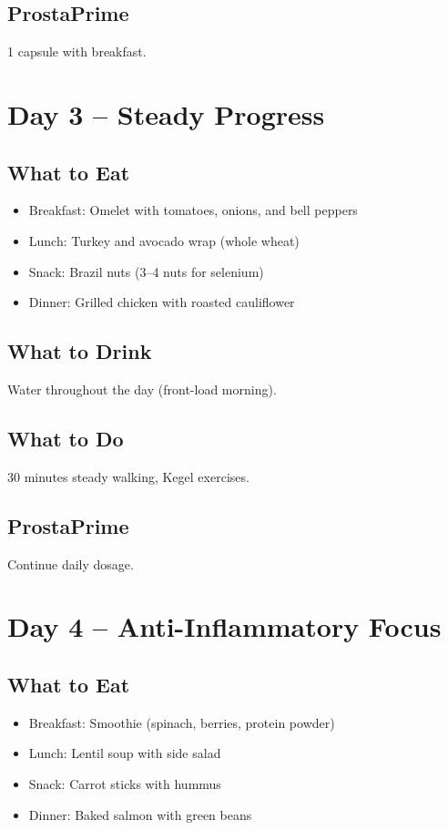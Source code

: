 \documentclass[11pt,oneside]{book}
\begin{document}
\section*{ProstaPrime}
1 capsule with breakfast.

\clearpage
\chapter*{Day 3 – Steady Progress}

\section*{What to Eat}
\begin{itemize}[leftmargin=*]
\item Breakfast: Omelet with tomatoes, onions, and bell peppers
\item Lunch: Turkey and avocado wrap (whole wheat)
\item Snack: Brazil nuts (3--4 nuts for selenium)
\item Dinner: Grilled chicken with roasted cauliflower
\end{itemize}

\section*{What to Drink}
Water throughout the day (front-load morning).

\section*{What to Do}
30 minutes steady walking, Kegel exercises.

\section*{ProstaPrime}
Continue daily dosage.

\clearpage
\chapter*{Day 4 – Anti-Inflammatory Focus}

\section*{What to Eat}
\begin{itemize}[leftmargin=*]
\item Breakfast: Smoothie (spinach, berries, protein powder)
\item Lunch: Lentil soup with side salad
\item Snack: Carrot sticks with hummus
\item Dinner: Baked salmon with green beans
\end{itemize}
\end{document}
